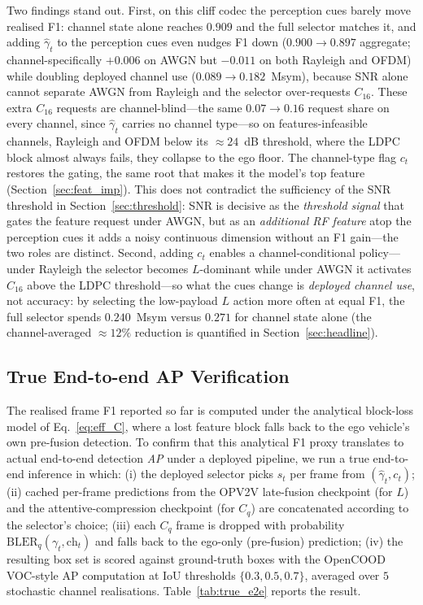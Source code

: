 \documentclass[journal]{IEEEtran}
\begin{document}
Two findings stand out. First, on this cliff codec the perception cues barely move realised F1: channel state alone reaches $0.909$ and the full selector matches it, and adding $\hat\gamma_t$ to the perception cues even nudges F1 down ($0.900\!\to\!0.897$ aggregate; channel-specifically $+0.006$ on AWGN but $-0.011$ on both Rayleigh and OFDM) while doubling deployed channel use ($0.089\!\to\!0.182$~Msym), because SNR alone cannot separate AWGN from Rayleigh and the selector over-requests $C_{16}$. These extra $C_{16}$ requests are channel-blind---the same $0.07\!\to\!0.16$ request share on every channel, since $\hat\gamma_t$ carries no channel type---so on features-infeasible channels, Rayleigh and OFDM below its ${\approx}24$~dB threshold, where the LDPC block almost always fails, they collapse to the ego floor. The channel-type flag $c_t$ restores the gating, the same root that makes it the model's top feature (Section~\ref{sec:feat_imp}). This does not contradict the sufficiency of the SNR threshold in Section~\ref{sec:threshold}: SNR is decisive as the \emph{threshold signal} that gates the feature request under AWGN, but as an \emph{additional RF feature} atop the perception cues it adds a noisy continuous dimension without an F1 gain---the two roles are distinct. Second, adding $c_t$ enables a channel-conditional policy---under Rayleigh the selector becomes $L$-dominant while under AWGN it activates $C_{16}$ above the LDPC threshold---so what the cues change is \emph{deployed channel use}, not accuracy: by selecting the low-payload $L$ action more often at equal F1, the full selector spends $0.240$~Msym versus $0.271$ for channel state alone (the channel-averaged ${\approx}12\%$ reduction is quantified in Section~\ref{sec:headline}).

\subsection{True End-to-end AP Verification}\label{sec:true_e2e}

The realised frame F1 reported so far is computed under the analytical block-loss model of Eq.~\eqref{eq:eff_C}, where a lost feature block falls back to the ego vehicle's own pre-fusion detection. To confirm that this analytical F1 proxy translates to actual end-to-end detection \emph{AP} under a deployed pipeline, we run a true end-to-end inference in which: (i) the deployed selector picks $s_t$ per frame from $(\hat\gamma_t,c_t)$; (ii) cached per-frame predictions from the OPV2V late-fusion checkpoint (for $L$) and the attentive-compression checkpoint (for $C_q$) are concatenated according to the selector's choice; (iii) each $C_q$ frame is dropped with probability $\mathrm{BLER}_q(\gamma_t,\mathrm{ch}_t)$ and falls back to the ego-only (pre-fusion) prediction; (iv) the resulting box set is scored against ground-truth boxes with the OpenCOOD VOC-style $\mathrm{AP}$ computation at IoU thresholds $\{0.3,0.5,0.7\}$, averaged over $5$ stochastic channel realisations. Table~\ref{tab:true_e2e} reports the result.
\end{document}
